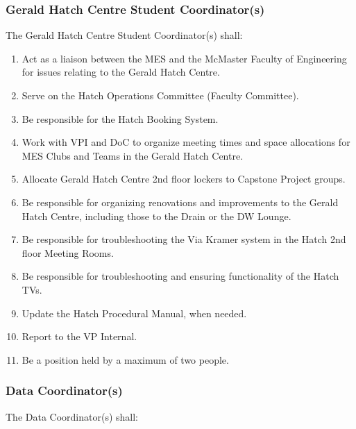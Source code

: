 \subsubsection{Gerald Hatch Centre Student Coordinator(s)}
\label{gerald-hatch-centre-student-coordinators}
The Gerald Hatch Centre Student Coordinator(s) shall:

\begin{enumerate}
 \item
  Act as a liaison between the MES and the McMaster Faculty of Engineering for issues relating to the Gerald Hatch Centre.
 \item
  Serve on the Hatch Operations Committee (Faculty Committee).
 \item
  Be responsible for the Hatch Booking System.
 \item
  Work with VPI and DoC to organize meeting times and space allocations for MES Clubs and Teams in the Gerald Hatch Centre.
 \item
  Allocate Gerald Hatch Centre 2nd floor lockers to Capstone Project groups.
 \item
  Be responsible for organizing renovations and improvements to the Gerald Hatch Centre, including those to the Drain or the DW Lounge.
 \item
  Be responsible for troubleshooting the Via Kramer system in the Hatch 2nd floor Meeting Rooms.
 \item
  Be responsible for troubleshooting and ensuring functionality of the Hatch TVs.
 \item
  Update the Hatch Procedural Manual, when needed.
 \item
  Report to the VP Internal.
 \item
  Be a position held by a maximum of two people.

\end{enumerate}

\subsubsection{Data Coordinator(s)}
\label{data-coordinators}
The Data Coordinator(s) shall:

